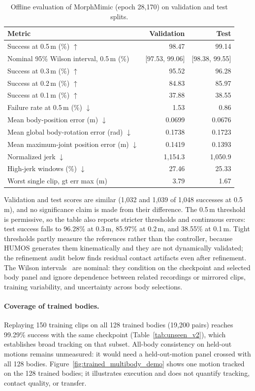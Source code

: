 \begin{table}[t]
\centering
\small
\caption{Offline evaluation of MorphMimic (epoch 28,170) on validation and test splits.}\label{tab:test_results}
\begin{tabular}{lrr}
\toprule
Metric & Validation & Test \\
\midrule
Success at 0.5\,m (\%) $\uparrow$ & 98.47 & 99.14 \\
Nominal 95\% Wilson interval, 0.5\,m (\%) & [97.53, 99.06] & [98.38, 99.55] \\
Success at 0.3\,m (\%) $\uparrow$ & 95.52 & 96.28 \\
Success at 0.2\,m (\%) $\uparrow$ & 84.83 & 85.97 \\
Success at 0.1\,m (\%) $\uparrow$ & 37.88 & 38.55 \\
Failure rate at 0.5\,m (\%) $\downarrow$ & 1.53 & 0.86 \\
Mean body-position error (m) $\downarrow$ & 0.0699 & 0.0676 \\
Mean global body-rotation error (rad) $\downarrow$ & 0.1738 & 0.1723 \\
Mean maximum-joint position error (m) $\downarrow$ & 0.1419 & 0.1393 \\
Normalized jerk $\downarrow$ & 1,154.3 & 1,050.9 \\
High-jerk windows (\%) $\downarrow$ & 27.46 & 25.33 \\
Worst single clip, gt err max (m) & 3.79 & 1.67 \\
\bottomrule
\end{tabular}
\end{table}

Validation and test scores are similar (1,032 and 1,039 of 1,048 successes at
0.5\,m), and no significance claim is made from their difference. The 0.5\,m
threshold is permissive, so the table also reports stricter thresholds and
continuous errors: test success falls to 96.28\% at 0.3\,m, 85.97\% at 0.2\,m,
and 38.55\% at 0.1\,m. Tight thresholds partly measure the references rather
than the controller, because HUMOS generates them kinematically and they are
not dynamically validated; the refinement audit below
finds residual contact artifacts even after refinement. The Wilson
intervals~\cite{wilson1927} are nominal: they condition on the checkpoint and
selected body panel and ignore dependence between related recordings or
mirrored clips, training variability, and uncertainty across body selections.

\paragraph{Coverage of trained bodies.}
Replaying 150 training clips on all 128 trained bodies (19,200 pairs) reaches
99.29\% success with the same checkpoint (Table~\ref{tab:unseen_v2}), which
establishes broad tracking on that subset. All-body consistency on held-out
motions remains unmeasured: it would need a held-out-motion panel crossed with
all 128 bodies. Figure~\ref{fig:trained_multibody_demo} shows one motion tracked
on the 128 trained bodies; it illustrates execution and does not quantify
tracking, contact quality, or transfer.

